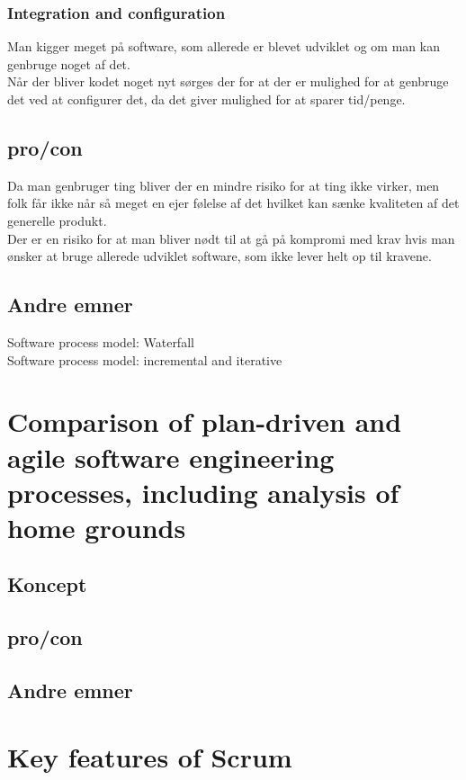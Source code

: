 \documentclass[11pt,a4paper]{article}
\begin{document}
\subsubsection*{Integration and configuration}
Man kigger meget på software, som allerede er blevet udviklet og om man kan genbruge noget af det.\\
Når der bliver kodet noget nyt sørges der for at der er mulighed for at genbruge det ved at configurer det, da det giver mulighed for at sparer tid/penge.
\subsection*{pro/con}
Da man genbruger ting bliver der en mindre risiko for at ting ikke virker, men folk får ikke når så meget en ejer følelse af det hvilket kan sænke kvaliteten af det generelle produkt.\\
Der er en risiko for at man bliver nødt til at gå på kompromi med krav hvis man ønsker at bruge allerede udviklet software, som ikke lever helt op til kravene.
\subsection*{Andre emner}
Software process model: Waterfall\\
Software process model: incremental and iterative\\
\newpage
\section{Comparison of plan-driven and agile software engineering processes, including analysis of home grounds}
\subsection{Koncept}
\subsection{pro/con}
\subsection{Andre emner}

\newpage
\section{Key features of Scrum}
\end{document}
